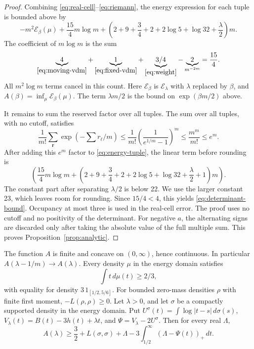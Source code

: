 \begin{proof}
Combining \eqref{eq:real-cell}--\eqref{eq:riemann}, the energy expression for each tuple is bounded above by
\begin{equation}\label{eq:energy-tuple}
 -m^2\mathcal E_\beta(\mu)+\frac{15}{4}m\log m+
 \left(2+9+\frac34+2+2\log5+\log32+\frac{\lambda}{2}\right)m.
\end{equation}
The coefficient of \(m\log m\) is the sum
\[
 \underbrace{4}_{\eqref{eq:moving-vdm}}
 +\underbrace{1}_{\eqref{eq:fixed-vdm}}
 +\underbrace{3/4}_{\eqref{eq:weight}}
 -\underbrace{2}_{m^{-2m}}
 =\frac{15}{4}.
\]
All \(m^2\log m\) terms cancel in this count. Here \(\mathcal E_\beta\) is \(\mathcal E_\lambda\) with \(\lambda\) replaced by \(\beta\), and \(A(\beta)=\inf_\mu \mathcal E_\beta(\mu)\). The term \(\lambda m/2\) is the bound on \(\exp(\beta m/2)\) above.

It remains to sum the reserved factor over all tuples. The sum over all tuples, with no cutoff, satisfies
\begin{equation}\label{eq:tail}
 \frac{1}{m!}\sum_{\boldsymbol r}\exp(-\sum r_\ell/m)
 \le \frac{1}{m!}\left(\frac{1}{e^{1/m}-1}\right)^m
 \le \frac{m^m}{m!}\le e^m.
\end{equation}
After adding this \(e^m\) factor to \eqref{eq:energy-tuple}, the linear term before rounding is
\[
\left(\frac{15}{4}m\log m+\left(2+9+\frac34+2+2\log5+\log32+\frac{\lambda}{2}+1\right)m\right).
\]
The constant part after separating \(\lambda/2\) is below 22. We use the larger constant 23, which leaves room for rounding. Since \(15/4<4\), this yields \eqref{eq:determinant-bound}. Occupancy at most three is used in the real-cell error. The proof uses no cutoff and no positivity of the determinant. For negative \(a\), the alternating signs are discarded only after taking the absolute value of the full multiple sum. This proves Proposition~\ref{prop:analytic}.
\end{proof}

\begin{lemma}\label{lem:energy-properties}
The function \(A\) is finite and concave on \((0,\infty)\), hence continuous. In particular \(A(\lambda-1/m)\to A(\lambda)\). Every density \(\mu\) in the energy domain satisfies
\[
 \int t\,d\mu(t)\ge 2/3,
\]
with equality for density \(3\,1_{[1/2,5/6]}\). For bounded zero-mass densities \(\rho\) with finite first moment, \(-L(\rho,\rho)\ge0\). Let \(\lambda>0\), and let \(\sigma\) be a compactly supported density in the energy domain. Put \(U^\sigma(t)=\int\log|t-s|\,d\sigma(s)\), \(V_\lambda(t)=B(t)-3h(t)+\lambda t\), and \(\Psi=V_\lambda-2U^\sigma\). Then for every real \(\Lambda\),
\begin{equation}\label{eq:energy-cert}
 A(\lambda)\ge\frac32+L(\sigma,\sigma)+\Lambda
 -3\int_{1/2}^\infty(\Lambda-\Psi(t))_+\,dt.
\end{equation}
\end{lemma}

